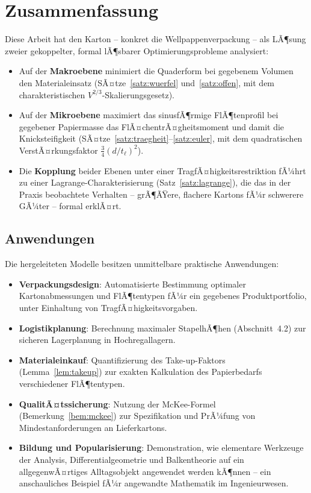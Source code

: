 ﻿\documentclass[a4paper,12pt]{article}
\theoremstyle{definition}
\begin{document}
\section{Zusammenfassung}

Diese Arbeit hat den Karton -- konkret die Wellpappenverpackung -- als LÃ¶sung zweier
gekoppelter, formal lÃ¶sbarer Optimierungsprobleme analysiert:

\begin{itemize}
	\item Auf der \textbf{Makroebene} minimiert die Quaderform bei gegebenem
	      Volumen den Materialeinsatz (SÃ¤tze~\ref{satz:wuerfel}
	      und~\ref{satz:offen}, mit dem charakteristischen
	      $V^{2/3}$-Skalierungsgesetz).
	\item Auf der \textbf{Mikroebene} maximiert das sinusfÃ¶rmige FlÃ¶tenprofil
	      bei gegebener Papiermasse das FlÃ¤chentrÃ¤gheitsmoment und damit die
	      Knicksteifigkeit (SÃ¤tze~\ref{satz:traegheit}--\ref{satz:euler}, mit
	      dem quadratischen VerstÃ¤rkungsfaktor $\tfrac{3}{4}(d/t_\ell)^2$).
	\item Die \textbf{Kopplung} beider Ebenen unter einer
	      TragfÃ¤higkeitsrestriktion fÃ¼hrt zu einer Lagrange-Charakterisierung
	      (Satz~\ref{satz:lagrange}), die das in der Praxis beobachtete
	      Verhalten -- grÃ¶ÃŸere, flachere Kartons fÃ¼r schwerere GÃ¼ter --
	      formal erklÃ¤rt.
\end{itemize}

\subsection{Anwendungen}

Die hergeleiteten Modelle besitzen unmittelbare praktische Anwendungen:

\begin{itemize}
	\item \textbf{Verpackungsdesign}: Automatisierte Bestimmung optimaler
	      Kartonabmessungen und FlÃ¶tentypen fÃ¼r ein gegebenes
	      Produktportfolio, unter Einhaltung von TragfÃ¤higkeitsvorgaben.
	\item \textbf{Logistikplanung}: Berechnung maximaler StapelhÃ¶hen
	      (Abschnitt~4.2) zur sicheren Lagerplanung in Hochregallagern.
	\item \textbf{Materialeinkauf}: Quantifizierung des Take-up-Faktors
	      (Lemma~\ref{lem:takeup}) zur exakten Kalkulation des
	      Papierbedarfs verschiedener FlÃ¶tentypen.
	\item \textbf{QualitÃ¤tssicherung}: Nutzung der McKee-Formel
	      (Bemerkung~\ref{bem:mckee}) zur Spezifikation und PrÃ¼fung von
	      Mindestanforderungen an Lieferkartons.
	\item \textbf{Bildung und Popularisierung}: Demonstration, wie
	      elementare Werkzeuge der Analysis, Differentialgeometrie und
	      Balkentheorie auf ein allgegenwÃ¤rtiges Alltagsobjekt angewendet
	      werden kÃ¶nnen -- ein anschauliches Beispiel fÃ¼r angewandte
	      Mathematik im Ingenieurwesen.
\end{itemize}
\end{document}
